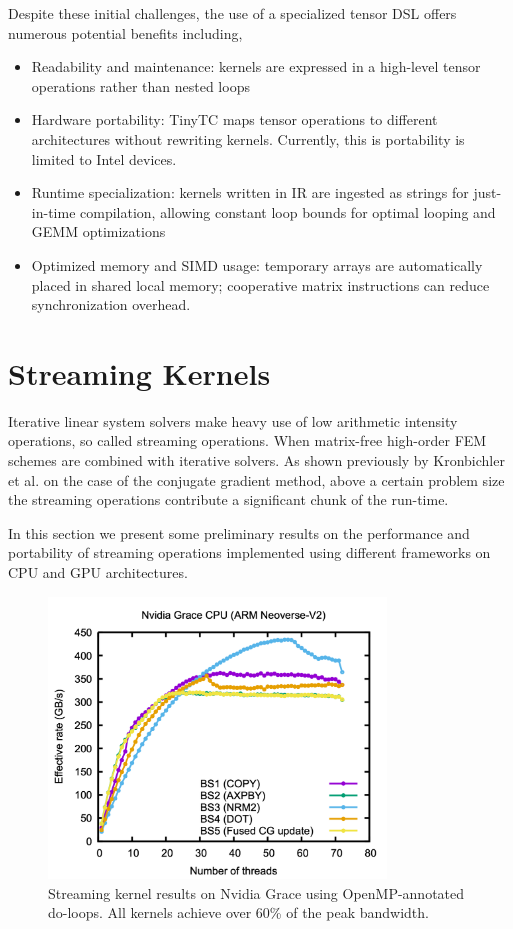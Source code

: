 \documentclass[a4paper,12pt]{article}
\begin{document}
Despite these initial challenges, the use of a specialized tensor DSL offers numerous potential benefits including,
\begin{itemize}
\item Readability and maintenance: kernels are expressed in a high-level tensor operations rather than nested loops
\item Hardware portability: TinyTC maps tensor operations to different architectures without rewriting kernels. Currently, this is portability is limited to Intel devices.
\item Runtime specialization: kernels written in IR are ingested as strings for just-in-time compilation, allowing constant loop bounds for optimal looping and GEMM optimizations
\item Optimized memory and SIMD usage: temporary arrays are automatically placed in shared local memory; cooperative matrix instructions can reduce synchronization overhead.
\end{itemize}


\section{Streaming Kernels}

Iterative linear system solvers make heavy use of low arithmetic intensity operations, so called streaming operations.
When matrix-free high-order FEM schemes are combined with iterative solvers. 
As shown previously by Kronbichler et al. \cite{kronbichler2023enhancing} on the case of the conjugate gradient method, above a certain problem size the streaming operations contribute a significant chunk of the run-time.

In this section we present some preliminary results on the performance and portability of
streaming operations implemented using different frameworks on CPU and GPU architectures.


\begin{figure}[htbp]
  \centering
  \includegraphics[width=0.8\textwidth]{omp_grace} %
  \caption{Streaming kernel results on Nvidia Grace using OpenMP-annotated do-loops. All kernels achieve over 60\% of the peak bandwidth.}
  \label{fig:streaming_omp_grace}
\end{figure}
\end{document}
